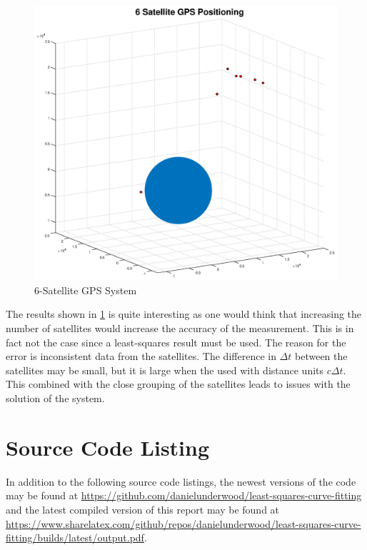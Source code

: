 \documentclass[10pt,a4paper]{article}
\begin{document}
\begin{figure}[H]
\includegraphics[width=\linewidth]{Figures/6satgps.eps}
\caption{6-Satellite GPS System}
\label{fig: 6satgps}
\end{figure}

The results shown in \cref{fig: 6satgps} is quite interesting as one would think that increasing the number of satellites would increase the accuracy of the measurement. This is in fact not the case since a least-squares result must be used. The reason for the error is inconsistent data from the satellites. The difference in $\Delta t$ between the satellites may be small, but it is large when the used with distance units $c \Delta t$. This combined with the close grouping of the satellites leads to issues with the solution of the system.

\newpage

\section*{Source Code Listing}

In addition to the following source code listings, the newest versions of the code may be found at \url{https://github.com/danielunderwood/least-squares-curve-fitting} and the latest compiled version of this report may be found at \url{https://www.sharelatex.com/github/repos/danielunderwood/least-squares-curve-fitting/builds/latest/output.pdf}.





\end{document}
